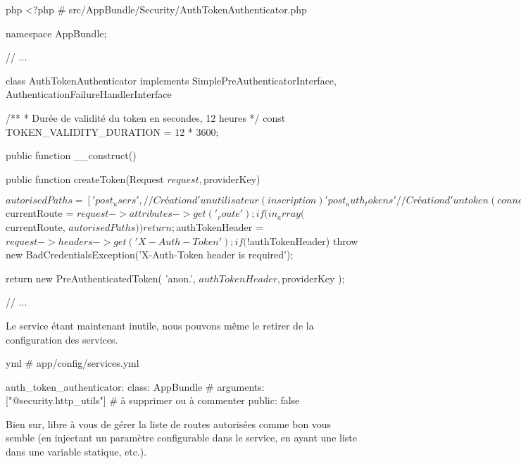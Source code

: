 \documentclass[big]{zmdocument}
\begin{document}
\begin{CodeBlock}{php}
<?php
# src/AppBundle/Security/AuthTokenAuthenticator.php

namespace AppBundle\Security;

// ...

class AuthTokenAuthenticator implements SimplePreAuthenticatorInterface, AuthenticationFailureHandlerInterface
{
    /**
    * Durée de validité du token en secondes, 12 heures
    */
    const TOKEN_VALIDITY_DURATION = 12 * 3600;

    public function __construct()
    {
    }

    public function createToken(Request $request, $providerKey)
    {
        $autorisedPaths = [
            'post_users', // Création d'un utilisateur (inscription)
            'post_auth_tokens' // Création d'un token (connexion)
        ];

        $currentRoute = $request->attributes->get('_route');
        
        if (in_array($currentRoute, $autorisedPaths)) {
            return;
        }
      
        $authTokenHeader = $request->headers->get('X-Auth-Token');

        if (!$authTokenHeader) {
            throw new BadCredentialsException('X-Auth-Token header is required');
        }

        return new PreAuthenticatedToken(
            'anon.',
            $authTokenHeader,
            $providerKey
        );
    }
    // ...
}
\end{CodeBlock}



Le service  étant maintenant inutile, nous pouvons même le retirer de la configuration des services.



\begin{CodeBlock}{yml}
# app/config/services.yml

auth_token_authenticator:
    class:     AppBundle\Security\AuthTokenAuthenticator
    # arguments: ["@security.http_utils"] # à supprimer ou à commenter
    public:    false
\end{CodeBlock}



Bien sur, libre à vous de gérer la liste de routes autorisées comme bon vous semble (en injectant un paramètre configurable dans le service, en ayant une liste dans une variable statique, etc.).
\end{document}
